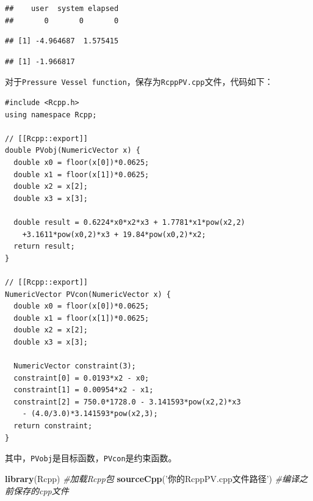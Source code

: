 \documentclass[]{ctexbook}
\newenvironment{Shaded}{\begin{snugshade}}{\end{snugshade}}
\newcommand{\KeywordTok}[1]{\textcolor[rgb]{0.13,0.29,0.53}{\textbf{#1}}}
\newcommand{\StringTok}[1]{\textcolor[rgb]{0.31,0.60,0.02}{#1}}
\newcommand{\CommentTok}[1]{\textcolor[rgb]{0.56,0.35,0.01}{\textit{#1}}}
\newcommand{\OperatorTok}[1]{\textcolor[rgb]{0.81,0.36,0.00}{\textbf{#1}}}
\newcommand{\NormalTok}[1]{#1}
\theoremstyle{definition}
\theoremstyle{definition}
\theoremstyle{definition}
\theoremstyle{remark}
\begin{document}
\begin{verbatim}
##    user  system elapsed 
##       0       0       0
\end{verbatim}

\begin{Shaded}
\end{Shaded}

\begin{verbatim}
## [1] -4.964687  1.575415
\end{verbatim}

\begin{Shaded}
\end{Shaded}

\begin{verbatim}
## [1] -1.966817
\end{verbatim}

对于\texttt{Pressure\ Vessel\ function}，保存为\texttt{RcppPV.cpp}文件，代码如下：

\begin{verbatim}
#include <Rcpp.h>
using namespace Rcpp;

// [[Rcpp::export]]
double PVobj(NumericVector x) {
  double x0 = floor(x[0])*0.0625;
  double x1 = floor(x[1])*0.0625;
  double x2 = x[2];
  double x3 = x[3];
  
  double result = 0.6224*x0*x2*x3 + 1.7781*x1*pow(x2,2) 
    +3.1611*pow(x0,2)*x3 + 19.84*pow(x0,2)*x2;
  return result;
}

// [[Rcpp::export]]
NumericVector PVcon(NumericVector x) {
  double x0 = floor(x[0])*0.0625;
  double x1 = floor(x[1])*0.0625;
  double x2 = x[2];
  double x3 = x[3];
  
  NumericVector constraint(3);
  constraint[0] = 0.0193*x2 - x0;
  constraint[1] = 0.00954*x2 - x1;
  constraint[2] = 750.0*1728.0 - 3.141593*pow(x2,2)*x3 
    - (4.0/3.0)*3.141593*pow(x2,3);
  return constraint;
}
\end{verbatim}

其中，\texttt{PVobj}是目标函数，\texttt{PVcon}是约束函数。

\begin{Shaded}
\begin{Highlighting}[]
\KeywordTok{library}\NormalTok{(Rcpp) }\CommentTok{#加载Rcpp包}
\KeywordTok{sourceCpp}\NormalTok{(}\StringTok{'你的RcppPV.cpp文件路径'}\NormalTok{) }\CommentTok{#编译之前保存的cpp文件}
\end{Highlighting}
\end{Shaded}
\end{document}
